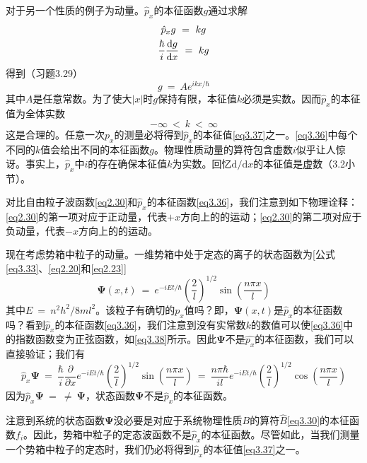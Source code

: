 \documentclass[12pt,a4paper,openany]{ctexbook}
\begin{document}
\begin{flushleft}
对于另一个性质的例子为动量。$\hat{p}_x$的本征函数$g$通过求解
\begin{gather}
    \hat{p}_xg\ =\ kg \notag \\
    \frac{\hbar}{i}\frac{\mathrm{d}g}{\mathrm{d}x}\ =\ kg \label{eq3.35}
\end{gather}
得到（习题3.29）
\begin{equation}
    g\ =\ Ae^{ikx/\hbar} \label{eq3.36}
\end{equation}
其中$A$是任意常数。为了使大$\left|x\right|$时$g$保持有限，本征值$k$必须是实数。因而$\hat{p}_x$的本征值为全体实数
\begin{equation}
    -\infty\ <\ k\ <\ \infty \label{eq3.37}
\end{equation}
这是合理的。任意一次$p_x$的测量必将得到$\hat{p}_x$的本征值\eqref{eq3.37}之一。\eqref{eq3.36}中每个不同的$k$值会给出不同的本征函数$g$。物理性质动量的算符包含虚数$i$似乎让人惊讶。事实上，$\hat{p}_x$中$i$的存在确保本征值$k$为实数。回忆$\mathrm{d}/\mathrm{d}x$的本征值是虚数（3.2小节）。

对比自由粒子波函数\eqref{eq2.30}和$\hat{p}_x$的本征函数\eqref{eq3.36}，我们注意到如下物理诠释：\eqref{eq2.30}的第一项对应于正动量，代表$+x$方向上的的运动；\eqref{eq2.30}的第二项对应于负动量，代表$-x$方向上的的运动。

现在考虑势箱中粒子的动量。一维势箱中处于定态的离子的状态函数为[公式\eqref{eq3.33}、\eqref{eq2.20}和\eqref{eq2.23}]
\begin{equation}
    \bm{\Psi}(x,t)\ =\ e^{-iEt/\hbar}(\frac{2}{l})^{1/2}\sin(\frac{n\pi x}{l}) \label{eq3.38}
\end{equation}
其中$E\ =\ n^2h^2/8ml^2$。该粒子有确切的$p_x$值吗？即，$\bm{\Psi}(x,t)$是$\hat{p}_x$的本征函数吗？看到$\hat{p}_x$的本征函数\eqref{eq3.36}，我们注意到没有实常数$k$的数值可以使\eqref{eq3.36}中的指数函数变为正弦函数，如\eqref{eq3.38}所示。因此$\bm{\Psi}$不是$\hat{p_x}$的本征函数，我们可以直接验证；我们有
\begin{equation*}
    \hat{p}_x\bm{\Psi}\ =\ \frac{\hbar}{i}\frac{\partial}{\partial x}e^{-iEt/\hbar}(\frac{2}{l})^{1/2}\sin(\frac{n\pi x}{l})\ =\ \frac{n\pi\hbar}{il}e^{-iEt/\hbar}(\frac{2}{l})^{1/2}\cos(\frac{n\pi x}{l})
\end{equation*}
因为$\hat{p}_x\bm{\Psi}\ =\ \neq\ \bm{\Psi}$，状态函数$\bm{\Psi}$不是$\hat{p}_x$的本征函数。

注意到系统的状态函数$\bm{\Psi}$没必要是对应于系统物理性质$B$的算符$\hat{B}$\eqref{eq3.30}的本征函数$f_i$。因此，势箱中粒子的定态波函数不是$\hat{p}_x$的本征函数。尽管如此，当我们测量一个势箱中粒子的定态时，我们仍必将得到$\hat{p}_x$的本征值\eqref{eq3.37}之一。


\end{flushleft}
\end{document}
